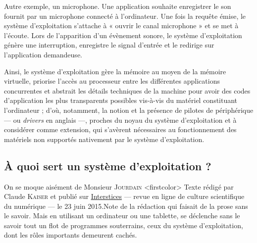 Autre exemple, un microphone. Une application souhaite enregistrer le son fournit par un microphone connecté à l'ordinateur. Une fois la requête émise, le système d'exploitation s'attache à « ouvrir le canal microphone » et se met à l'écoute. Lors de l'apparition d'un évènement sonore, le système d'exploitation génère une interruption, enregistre le signal d'entrée et le redirige sur l'application demandeuse.


\begin{fullwidth}
\begin{tcolorbox}[
	enhanced jigsaw,
	width=\linewidth,
	breakable,
	parbox=true,
	colframe=secondcolor,
	colback=gray!20,
	arc = 0pt, outer arc = 0pt,
	leftrule = 2pt, rightrule = 2pt,
	bottomrule = 0pt, toprule=0pt,
	boxrule = 0pt,
	boxsep = 0pt,%
	left = 8pt, right = 8pt,%
	top = 6pt, bottom = 4pt,%
	title={\strut\textsc{\boxtitlefont En bref...}},
	toptitle=5pt, bottomtitle=3pt,
	before skip=10pt,
	after skip=2pt,
	]
Ainsi, le système d'exploitation gère la mémoire au moyen de la mémoire virtuelle, priorise l'accès au processeur entre les différentes applications concurrentes et abstrait les détails techniques de la machine pour avoir des codes d'application les plus transparents possibles vis-à-vis du matériel constituant l’ordinateur ; d'où, notamment, la notion et la présence de pilotes de périphérique --- ou \textit{drivers} en anglais ---, proches du noyau du système d'exploitation et à considérer comme extension, qui s'avèrent nécessaires au fonctionnement des matériels non supportés nativement par le système d'exploitation.
\end{tcolorbox}
\end{fullwidth}

\subsection[À quoi sert un OS ?]{À quoi sert un système d'exploitation ?}
\label{subsub:I.2.2}

On se moque aisément de Monsieur \textsc{Jourdain}%
\caution[t]<firstcolor>{%
Texte rédigé par Claude \textsc{Kaiser} et publié sur \href{https://interstices.info/a-quoi-sert-un-systeme-dexploitation/}{Interstices} --- revue en ligne de culture scientifique du numérique --- le 23 juin 2015.}{Note de la rédaction}
qui faisait de la prose sans le savoir. Mais en utilisant un ordinateur ou une tablette, se déclenche sans le savoir tout un flot de programmes souterrains, ceux du système d’exploitation, dont les rôles importants demeurent cachés.

